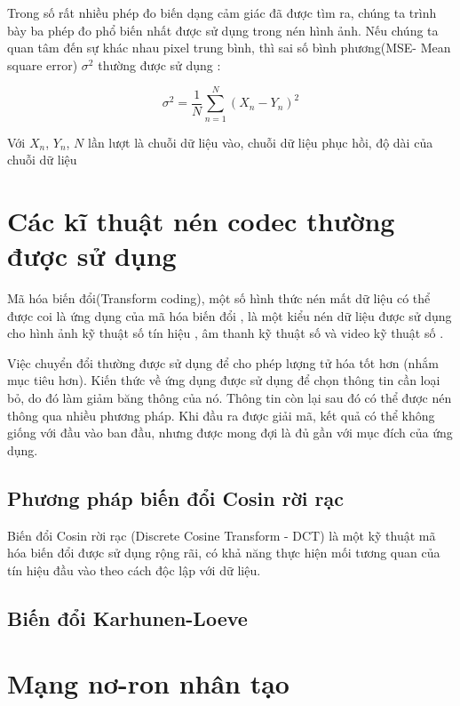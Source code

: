 Trong số rất nhiều phép đo biến dạng cảm giác đã được tìm ra,
chúng ta trình bày ba phép đo phổ biến nhất được sử dụng
trong nén hình ảnh. Nếu chúng ta quan tâm đến sự khác nhau
pixel trung bình, thì sai số bình phương(MSE- Mean square error)
$\sigma^2$ thường được sử dụng :

\begin{equation}
    \sigma^2 =  \frac{1}{N} \sum_{n=1}^{N} {\left( {X_n-Y_n} \right)}^2
\end{equation}

Với $X_n$, $Y_n$, $N$ lần lượt là chuỗi dữ liệu vào, chuỗi dữ liệu phục hồi,
độ dài của chuỗi dữ liệu

\section{Các kĩ thuật nén codec thường được sử dụng}

Mã hóa biến đổi(Transform coding), một số hình thức nén mất dữ liệu có thể được coi là ứng dụng
của mã hóa biến đổi , là một kiểu nén dữ liệu được sử dụng cho
hình ảnh kỹ thuật số tín hiệu , âm thanh kỹ thuật số và video kỹ thuật số .

Việc chuyển đổi thường được sử dụng để cho phép lượng tử
hóa tốt hơn (nhắm mục tiêu hơn). Kiến thức về ứng dụng được
sử dụng để chọn thông tin cần loại bỏ, do đó làm giảm băng
thông của nó. Thông tin còn lại sau đó có thể được nén thông
qua nhiều phương pháp. Khi đầu ra được giải mã, kết quả có
thể không giống với đầu vào ban đầu, nhưng được mong đợi là
đủ gần với mục đích của ứng dụng.

\subsection{Phương pháp biến đổi Cosin rời rạc}

Biến đổi Cosin rời rạc (Discrete Cosine Transform - DCT)
là một kỹ thuật mã hóa biến đổi được sử dụng rộng rãi,
có khả năng thực hiện mối tương quan của tín hiệu đầu vào
theo cách độc lập với dữ liệu.

\subsection{Biến đổi Karhunen-Loeve}

\section{Mạng nơ-ron nhân tạo}

